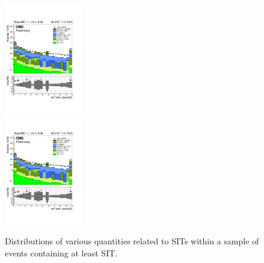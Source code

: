\begin{figure}[h!]
\begin{center}
    \includegraphics[width=0.3\textwidth,page=9,trim=0 100 50 100,clip]{figures/SITV/SIT/SIT.pdf}\\
    \includegraphics[width=0.3\textwidth,page=3,trim=0 100 50 100,clip]{figures/SITV/SIT/SIT.pdf}~
    \caption{Distributions of various quantities related to SITs
      within a sample of \mj events containing at least SIT.}
    \label{fig:dataMC_SIT_mu}
  \end{center} 
\end{figure}

